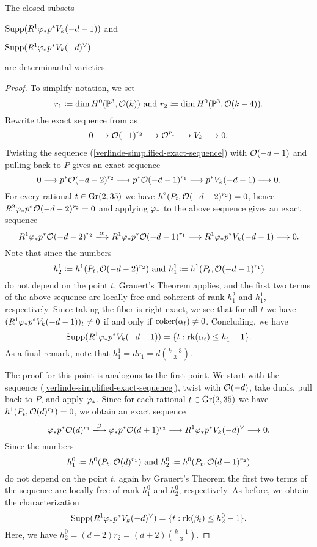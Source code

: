 \begin{proposition}
The closed subsets

$\operatorname{Supp}(R^1 \varphi_{*}p^{*} V_{k}(-d-1))$ and

$\operatorname{Supp}(R^1 \varphi_{*}p^{*} V_{k}(-d)^\vee)$ 

are determinantal varieties.
\end{proposition}
\begin{proof}
To simplify notation, we set
\[r_1 \coloneqq \dim H^0(\mathbb{P}^3, \mathcal{O}(k))
\text{ and }
r_2 \coloneqq \dim H^0(\mathbb{P}^3, \mathcal{O}(k-4)).\]
Rewrite the exact sequence from  as
\begin{align}
0 \longrightarrow \mathcal{O}(-1)^{r_2} \longrightarrow \mathcal{O}^{r_1} \longrightarrow V_k \longrightarrow 0. \label{verlinde-simplified-exact-sequence}
\end{align}
 Twisting the sequence (\ref{verlinde-simplified-exact-sequence}) with $\mathcal{O}(-d-1)$ and pulling back to $P$ gives an exact sequence
\[
0
\longrightarrow  {p^{*}\mathcal{O}(-d-2)^{r_2}}
\longrightarrow  {p^{*}\mathcal{O}(-d-1)^{r_1}}
\longrightarrow  {p^{*}V_k(-d-1)}
\longrightarrow  0.
\]
For every rational $t\in \operatorname{Gr}(2,35)$ we have
$h^2(P_t, \mathcal{O}(-d-2)^{r_2}) = 0$,
hence
$R^2\varphi_{*}p^{*}\mathcal{O}(-d-2)^{r_2} = 0$
and applying $\varphi_{*}$ to the above sequence gives an exact sequence
\[
R^1\pushf{\phi}\pullb{p}\mc{O}(-d-2)^{r_2}
\xlongrightarrow{\alpha}
R^1\pushf{\phi}\pullb{p}\mc{O}(-d-1)^{r_1} 
\to
R^1\pushf{\phi}\pullb{p} V_k(-d-1)
\to 0.
\]
Note that since the numbers
\[
h^{1}_{2}\coloneqq h^1(P_t, \mathcal{O}(-d-2)^{r_2})
\text{ and }
h_{1}^{1}\coloneqq h^1(P_t, \mathcal{O}(-d-1)^{r_1})
\]
do not depend on the point $t$, Grauert's Theorem applies, and the first two terms of the above sequence are locally free and coherent of rank $h_1^2$ and $h_1^1$, respectively. Since taking the fiber is right-exact, we see that for all $t$ we have
$(R^1\varphi_{*}p^{*} V_k(-d-1))_t \neq 0$ if and only if $\operatorname{coker}(\alpha_t) \neq 0$. Concluding, we have
\[
\operatorname{Supp}(R^1\varphi_{*}p^{*} V_k(-d-1))
= \{t : \operatorname{rk} (\alpha_t)\leq h^{1}_1 - 1\}.
\]
As a final remark, note that $h^1_1 = d r_1 = d \binom{k+3}{3}.$

 The proof for this point is analogous to the first point. We start with the sequence (\ref{verlinde-simplified-exact-sequence}), twist with $\mathcal{O}(-d)$, take duals, pull back to $P$, and apply $\varphi_{*}$. Since for each rational $t\in \operatorname{Gr}(2,35)$ we have $h^1(P_t, \mathcal{O}(d)^{r_1})=0$, we obtain an exact sequence
\[
	{\pushf{\phi}\pullb{p}\mc{O}(d)^{r_1} }
\xlongrightarrow{\beta}	{\pushf{\phi}\pullb{p}\mc{O}(d+1)^{r_2}}
\to	{R^1 \pushf{\phi}\pullb{p} V_{k}(-d)\dual}
\to 0.
\]
Since the numbers \[h^0_1 \coloneqq h^0(P_t,\mathcal{O}(d)^{r_1}) \text{ and }
h^0_2 \coloneqq h^0(P_t, \mathcal{O}(d+1)^{r_2})\] do not depend on the point $t$, again by Grauert's Theorem the first two terms of the sequence are locally free of rank $h^0_1$ and $h^0_2$, respectively. As before, we obtain the characterization
\[
	\operatorname{Supp}(R^1 \varphi_{*}p^{*} V_{k}(-d)^\vee)
	= \{t : \operatorname{rk} (\beta_t)\leq h^{0}_2 - 1\}.
\]
Here, we have $h_2^0 = (d+2)r_2 = (d+2)\binom{k-1}{3}.$
\end{proof}